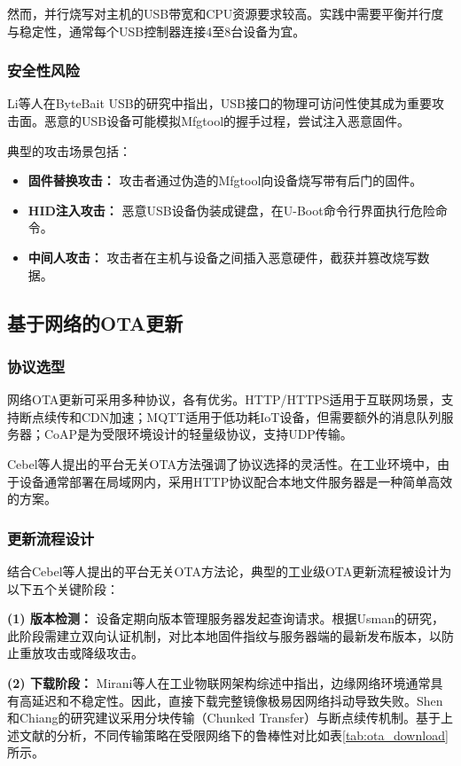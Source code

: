\documentclass[a4paper,12pt]{article}
\begin{document}
然而，并行烧写对主机的USB带宽和CPU资源要求较高。实践中需要平衡并行度与稳定性，通常每个USB控制器连接4至8台设备为宜。

\subsubsection{安全性风险}
Li等人在ByteBait USB的研究中指出，USB接口的物理可访问性使其成为重要攻击面\cite{Li2025}。恶意的USB设备可能模拟Mfgtool的握手过程，尝试注入恶意固件。

典型的攻击场景包括：
\begin{itemize}
    \item \textbf{固件替换攻击：} 攻击者通过伪造的Mfgtool向设备烧写带有后门的固件。
    \item \textbf{HID注入攻击：} 恶意USB设备伪装成键盘，在U-Boot命令行界面执行危险命令。
    \item \textbf{中间人攻击：} 攻击者在主机与设备之间插入恶意硬件，截获并篡改烧写数据。
\end{itemize}

\subsection{基于网络的OTA更新}

\subsubsection{协议选型}
网络OTA更新可采用多种协议，各有优劣。HTTP/HTTPS适用于互联网场景，支持断点续传和CDN加速；MQTT适用于低功耗IoT设备，但需要额外的消息队列服务器；CoAP是为受限环境设计的轻量级协议，支持UDP传输。

Cebel等人提出的平台无关OTA方法强调了协议选择的灵活性\cite{Cebel2022}。在工业环境中，由于设备通常部署在局域网内，采用HTTP协议配合本地文件服务器是一种简单高效的方案。
\subsubsection{更新流程设计}
结合Cebel等人提出的平台无关OTA方法论\cite{Cebel2022}，典型的工业级OTA更新流程被设计为以下五个关键阶段：

\textbf{(1) 版本检测：} 
设备定期向版本管理服务器发起查询请求。根据Usman的研究，此阶段需建立双向认证机制，对比本地固件指纹与服务器端的最新发布版本，以防止重放攻击或降级攻击\cite{Usman2025}。

\textbf{(2) 下载阶段：} 
Mirani等人在工业物联网架构综述中指出，边缘网络环境通常具有高延迟和不稳定性\cite{Mirani2022}。因此，直接下载完整镜像极易因网络抖动导致失败。Shen和Chiang的研究建议采用分块传输（Chunked Transfer）与断点续传机制\cite{Shen2007}。基于上述文献的分析，不同传输策略在受限网络下的鲁棒性对比如表\ref{tab:ota_download}所示。
\end{document}

